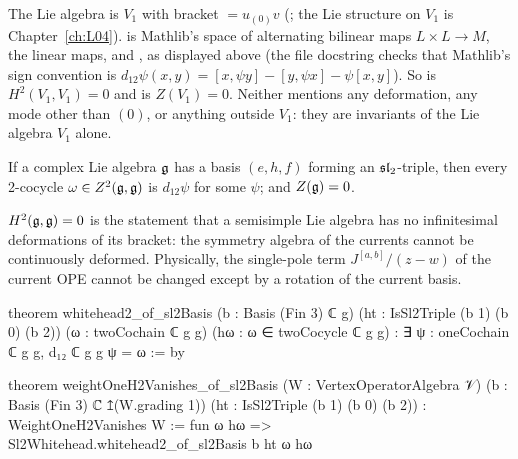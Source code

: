 \begin{dictionary}
The Lie algebra is $V_1$ with bracket  $= u_{(0)}v$ (;
the Lie structure on $V_1$ is Chapter~\ref{ch:L04}).  is Mathlib's space of
alternating bilinear maps $L\times L\to M$,  the linear maps, and ,
 as displayed above (the file docstring checks that Mathlib's sign convention is
$d_{12}\psi(x,y) = [x,\psi y]-[y,\psi x]-\psi[x,y]$). So  is
$H^2(V_1,V_1) = 0$ and  is $Z(V_1) = 0$. Neither mentions any
deformation, any mode other than $(0)$, or anything outside $V_1$: they are invariants of the Lie
algebra $V_1$ alone.
\end{dictionary}

\begin{theorem}\label{l09:thm:whitehead}
If a complex Lie algebra $\mathfrak{g}$ has a basis $(e,h,f)$ forming an $\mathfrak{sl}_2$-triple, then every
2-cocycle $\omega\in Z^2(\mathfrak{g},\mathfrak{g})$ is $d_{12}\psi$ for some $\psi$; and $Z(\mathfrak{g})=0$.
\end{theorem}
\begin{physics}
$H^2(\mathfrak{g},\mathfrak{g})=0$ is the statement that a semisimple Lie algebra has no infinitesimal deformations of
its bracket: the symmetry algebra of the currents cannot be continuously deformed. Physically, the
single-pole term $J^{[a,b]}/(z-w)$ of the current OPE cannot be changed except by a rotation of the current
basis.
\end{physics}


\begin{leancode}
theorem whitehead2_of_sl2Basis (b : Basis (Fin 3) ℂ g) (ht : IsSl2Triple (b 1) (b 0) (b 2))
    (ω : twoCochain ℂ g g) (hω : ω ∈ twoCocycle ℂ g g) :
    ∃ ψ : oneCochain ℂ g g, d₁₂ ℂ g g ψ = ω := by
\end{leancode}
\begin{leancode}
theorem weightOneH2Vanishes_of_sl2Basis (W : VertexOperatorAlgebra 𝒱)
    (b : Basis (Fin 3) ℂ ↥(W.grading 1)) (ht : IsSl2Triple (b 1) (b 0) (b 2)) :
    WeightOneH2Vanishes W :=
  fun ω hω => Sl2Whitehead.whitehead2_of_sl2Basis b ht ω hω
\end{leancode}

